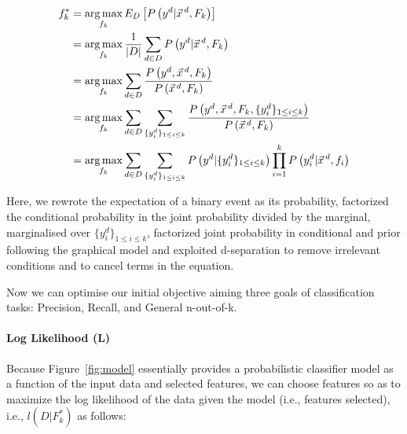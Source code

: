 {\small
\begin{align}
f_k^*&=\argmax_{f_k}E_D\left[P\left(y^d|\vec{x}^{\,d},F_k\right)\right]\nonumber\\
&=\argmax_{f_k}\frac{1}{|D|}\sum_{d\in D} P\left(y^d | \vec{x}^{\,d},F_k\right)\nonumber\\
&=\argmax_{f_k}\sum_{d\in D}\frac{P\left(y^d,\vec{x}^{\,d},F_k\right)}{P\left(\vec{x}^{\,d},F_k\right)}\nonumber\\
&=\argmax_{f_k}\sum_{d\in D}\sum_{\{y_{i}^d\}_{1\leq i\leq k}}\frac{P\left(y^d,\vec{x}^{\,d},F_k,\{y_{i}^d\}_{1\leq i\leq k}\right)}{P\left(\vec{x}^{\,d},F_k\right)}\nonumber\\
&=\argmax_{f_k}\sum_{d\in D}\sum_{\{y_i^d\}_{1\leq i\leq k}}P\left(y^d|\{y^d_i\}_{1\leq i\leq k}\right)\prod_{i=1}^kP\left(y_i^d|\vec{x}^{\,d},f_i\right)\label{eq:expect}
\end{align}}

Here, we rewrote the expectation of a binary event as its probability,
factorized the conditional probability in the joint probability
divided by the marginal, marginalised over $\{y^d_i\}_{1\leq i\leq
  k}$, factorized joint probability in conditional and prior following
the graphical model and exploited d-separation to remove irrelevant
conditions and to cancel terms in the equation.

Now we can optimise our initial objective aiming three goals of classification tasks: Precision, Recall, and General n-out-of-k.
\ENDCOMMENT

\paragraph{Log Likelihood (L)}

Because Figure~\ref{fig:model} essentially provides a probabilistic classifier model as a function
of the input data and selected features, we can choose features so as to maximize the log likelihood
of the data given the model (i.e., features selected), i.e., $l(D|F_k^*)$ as follows:

